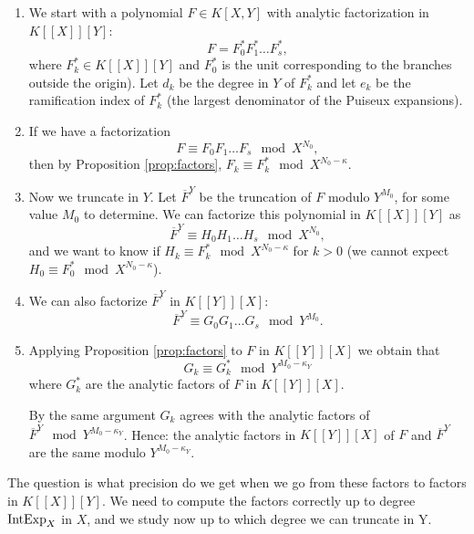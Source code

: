 \documentclass[a4paper,11pt,reqno]{amsart}%
\theoremstyle{definition}
\theoremstyle{plain}
\theoremstyle{remark}
\newcommand\ct[1]{\text{\rmfamily\upshape #1}}
\newcommand{\IntExpX}{\ct{IntExp}_X}
\begin{document}
\begin{enumerate}
\item We start with a polynomial $F \in K[X,Y]$ with analytic factorization in $K[[X]][Y]$:
$$
F = F_0^* F_1^* \dots F_s^*,$$
where $F_k^* \in K[[X]][Y]$ and $F_0^*$ is the unit corresponding to the branches outside the origin). Let $d_k$ be the degree in $Y$ of $F_k^*$ and let $e_k$ be the ramification index of $F_k^*$ (the largest denominator of the Puiseux expansions).

\item If we have a factorization
\begin{equation} \label{FXfactors}
F \equiv  F_0 F_1 \dots F_s \mod X^{N_0},
\end{equation}
then by Proposition \ref{prop:factors}, $F_k \equiv F_k^* \mod X^{N_0 - \kappa}$.


\item Now we truncate in $Y$. Let $\overline{F}^{Y}$ be the truncation of $F$ modulo $Y^{M_0}$, for some value $M_0$ to determine. We can factorize this polynomial in $K[[X]][Y]$ as
$$
\overline{F}^{Y} \equiv  {H}_0 {H}_1 \dots {H}_s \mod X^{N_0},
$$
and we want to know if ${H}_k \equiv F^*_k \mod X^{N_0 - \kappa}$ for $k > 0$ (we cannot expect $H_0 \equiv F_0^* \mod X^{N_0 - \kappa}$).

\item We can also factorize $\overline{F}^{Y}$ in $K[[Y]][X]$:
$$\overline{F}^{Y} \equiv G_0 G_1 \dots G_s \mod Y^{M_0}.$$

\item Applying Proposition \ref{prop:factors} to ${F}$ in $K[[Y]][X]$  we obtain that
$$G_k \equiv G_k^* \mod Y^{M_0 - \kappa_Y}$$
where $G_k^*$ are the analytic factors of $F$ in $K[[Y]][X]$.

By the same argument $G_k$ agrees with the analytic factors of $\overline{F}^{Y} \mod Y^{M_0 - \kappa_Y}$.
Hence: the analytic factors in $K[[Y]][X]$ of $F$ and $\overline{F}^{Y}$ are the same modulo $Y^{M_0 - \kappa_Y}$.

\end{enumerate}

The question is what precision do we get when we go from these factors to factors in $K[[X]][Y]$.
We need to compute the factors correctly up to degree $\IntExpX$ in $X$, and we study now up to which degree we can truncate in Y.
\end{document}
